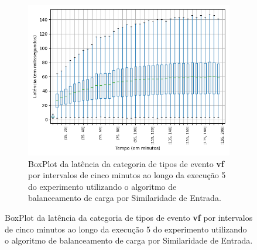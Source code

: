 

\begin{figure}
\centering
\begin{subfigure}{.5\textwidth}
\centering
\includegraphics[width=\textwidth]{figuras/graphics/boxplot_10-dez-is_vf.png}
\caption{BoxPlot da latência da categoria de tipos de evento \textbf{vf} por intervalos de cinco minutos ao longo da execução 5 do experimento utilizando o algoritmo de balanceamento de carga por Similaridade de Entrada.}
\label{fig:BoxPlot_vf_10-dez-is}
\end{subfigure}%


\end{figure}
